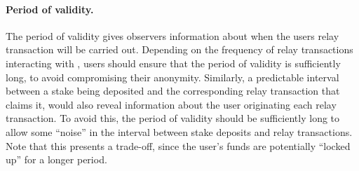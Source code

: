 \paragraph{Period of validity.} The period of validity gives observers information about when the users relay transaction will be carried out. Depending on the frequency of relay transactions interacting with \stakecontract{}, users should ensure that the period of validity is sufficiently long, to avoid compromising their anonymity. Similarly, a predictable interval between a stake being deposited and the corresponding relay transaction that claims it, would also reveal information about the user originating each relay transaction. To avoid this, the period of validity should be sufficiently long to allow some ``noise'' in the interval between stake deposits and relay transactions. Note that this presents a trade-off, since the user's funds are potentially ``locked up'' for a longer period.







